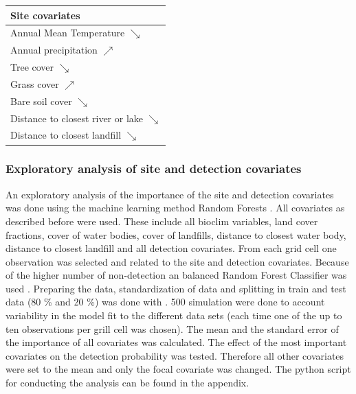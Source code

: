 \begin{multicols}{2}
\begin{center}
	\begin{tabular}{l}
		\toprule
		\textbf{Site covariates}\\ \midrule 
		Annual Mean Temperature $\searrow$  \\
		Annual precipitation $\nearrow$ \\
		Tree cover  $\searrow$ \\
		Grass cover $\nearrow$ \\
		Bare soil cover   $\searrow$ \\
		Distance to closest river or lake  $\searrow$ \\
		Distance to closest landfill  $\searrow$ \\
		\bottomrule
	\end{tabular}
	\label{table:covariates}
\end{center}	

\subsubsection*{Exploratory analysis of site and detection covariates}
An exploratory analysis of the importance of the site and detection covariates was done using the machine learning method Random Forests \parencite{Ho1995}. All covariates as described before were used. These include all bioclim variables, land cover fractions, cover of water bodies, cover of landfills, distance to closest water body, distance to closest landfill and all detection covariates. From each grid cell one observation was selected and related to the site and detection covariates. Because of the higher number of non-detection an balanced Random Forest Classifier was used \parencite[with default parameters]{Imbalanced-learn}. Preparing the data, standardization of data and splitting in train and test data (80 \% and 20 \%) was done with \textcite{sklearn, numpy, pandas}. 500 simulation were done to account variability in the model fit to the different data sets (each time one of the up to ten observations per grill cell was chosen). The mean and the standard error of the importance of all covariates was calculated. The effect of the most important covariates on the detection probability was tested. Therefore all other covariates were set to the mean and only the focal covariate was changed. The python script for conducting the analysis can be found in the appendix. 



\end{multicols}
